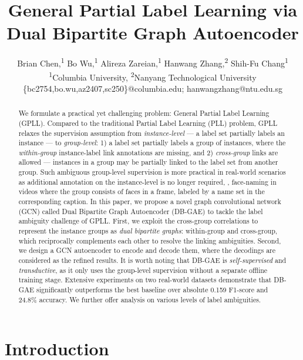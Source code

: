 \documentclass[letterpaper]{article} \usepackage{aaai20}  \usepackage{times}  \usepackage{helvet} \usepackage{courier}  \usepackage[hyphens]{url}  \usepackage{graphicx} \urlstyle{rm} \def\UrlFont{\rm}  \frenchspacing  \setlength{\pdfpagewidth}{8.5in}  \setlength{\pdfpageheight}{11in}  \frenchspacing
\title{General Partial Label Learning via Dual Bipartite Graph Autoencoder}
\author{
Brian Chen,\textsuperscript{\rm 1}
Bo Wu,\textsuperscript{\rm 1}
Alireza Zareian,\textsuperscript{\rm 1}
Hanwang Zhang,\textsuperscript{\rm 2}
Shih-Fu Chang\textsuperscript{\rm 1}\\
\textsuperscript{\rm 1}Columbia University,
\textsuperscript{\rm 2}Nanyang Technological University\\
\{bc2754,bo.wu,az2407,sc250\}@columbia.edu; hanwangzhang@ntu.edu.sg
}
\begin{document}
\maketitle



\begin{abstract}
We formulate a practical yet challenging problem: General Partial Label Learning (GPLL). Compared to the traditional Partial Label Learning (PLL) problem, GPLL relaxes the supervision assumption from \emph{instance-level} --- a label set partially labels an instance --- to \emph{group-level}: 1) a label set partially labels a group of instances, where the \emph{within-group} instance-label link annotations are missing, and 2) \emph{cross-group} links are allowed --- instances in a group may be partially linked to the label set from another group. Such ambiguous group-level supervision is more practical in real-world scenarios as additional annotation on the instance-level is no longer required, \eg, face-naming in videos where the group consists of faces in a frame, labeled by a name set in the corresponding caption. In this paper, we propose a novel graph convolutional network (GCN) called Dual Bipartite Graph Autoencoder (DB-GAE) to tackle the label ambiguity challenge of GPLL. First, we exploit the cross-group correlations to represent the instance groups as \emph{dual bipartite graphs}: within-group and cross-group, which reciprocally complements each other to resolve the linking ambiguities. Second, we design a GCN autoencoder to encode and decode them, where the decodings are considered as the refined results.
It is worth noting that DB-GAE is \emph{self-supervised} and \emph{transductive}, as it only uses the group-level supervision without a separate offline training stage. Extensive experiments on two real-world datasets demonstrate that DB-GAE significantly outperforms the best baseline over absolute 0.159 F1-score and 24.8\% accuracy. We further offer analysis on various levels of label ambiguities.
\end{abstract}

\section{Introduction} \label{sec:introduction}
\end{document}
